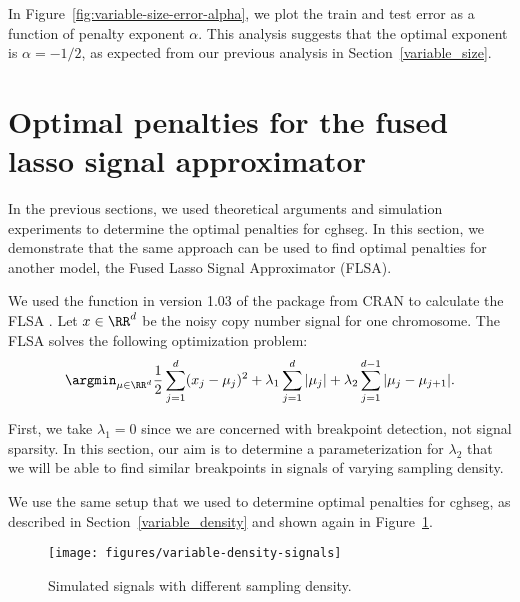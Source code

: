 \documentclass{article}
\begin{document}

In Figure~\ref{fig:variable-size-error-alpha}, we plot the train and
test error as a function of penalty exponent $\alpha$. This analysis
suggests that the optimal exponent is $\alpha=-1/2$, as expected from
our previous analysis in Section~\ref{variable_size}.


\newpage
\section{Optimal penalties for the fused lasso signal approximator}

In the previous sections, we used theoretical arguments and simulation
experiments to determine the optimal penalties for cghseg. In this
section, we demonstrate that the same approach can be used to find
optimal penalties for another model, the Fused Lasso Signal
Approximator (FLSA).

We used the  function in version 1.03 of the 
package from CRAN to calculate the FLSA \citep{fused-lasso-path}. Let
$x\in\RR^d$ be the noisy copy number signal for one chromosome. The
FLSA solves the following optimization problem:
\begin{equation}
  \label{eq:flsa}
\argmin_{\mu\in\RR^d} 
\frac 1 2 \sum_{j=1}^d (x_j-\mu_j)^2
+\lambda_1\sum_{j=1}^d|\mu_j|
+\lambda_2\sum_{j=1}^{d-1}|\mu_j-\mu_{j+1}|.
\end{equation}

First, we take $\lambda_1=0$ since we are concerned with breakpoint
detection, not signal sparsity. In this section, our aim is to
determine a parameterization for $\lambda_2$ that we will be able to
find similar breakpoints in signals of varying sampling density.

We use the same setup that we used to determine optimal penalties for
cghseg, as described in Section~\ref{variable_density} and shown again
in Figure~\ref{fig:variable-density-signals-flsa}.

\begin{figure}[h]
  \centering
  \texttt{[image: figures/variable-density-signals]}
  \caption{Simulated signals with different
  sampling density.}
  \label{fig:variable-density-signals-flsa}
\end{figure}
\end{document}
